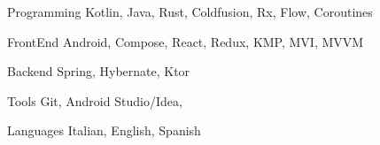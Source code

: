 

\begin{cvskills}

    \cvskill
    {Programming} %
    {Kotlin, Java, Rust, Coldfusion, Rx, Flow, Coroutines} %

    \cvskill
    {FrontEnd} %
    {Android, Compose, React, Redux, KMP, MVI, MVVM} %

    \cvskill
    {Backend} %
    {Spring, Hybernate, Ktor} %

    \cvskill
    {Tools} %
    {Git, Android Studio/Idea, } %

    \cvskill
    {Languages} %
    {Italian, English, Spanish} %

\end{cvskills}
